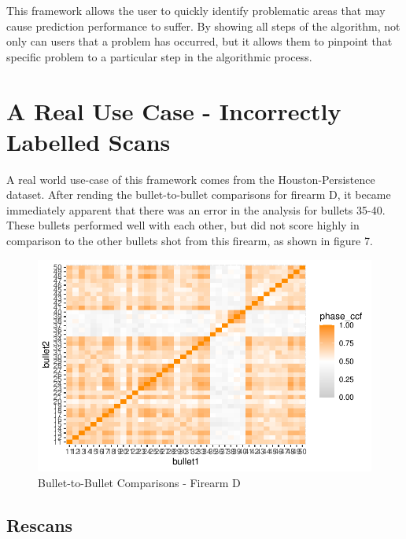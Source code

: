 \documentclass[
  number]{elsarticle}
\begin{document}
This framework allows the user to quickly identify problematic areas
that may cause prediction performance to suffer. By showing all steps of
the algorithm, not only can users that a problem has occurred, but it
allows them to pinpoint that specific problem to a particular step in
the algorithmic process.

\hypertarget{a-real-use-case---incorrectly-labelled-scans}{%
\section{A Real Use Case - Incorrectly Labelled
Scans}\label{a-real-use-case---incorrectly-labelled-scans}}

A real world use-case of this framework comes from the
Houston-Persistence dataset. After rending the bullet-to-bullet
comparisons for firearm D, it became immediately apparent that there was
an error in the analysis for bullets 35-40. These bullets performed well
with each other, but did not score highly in comparison to the other
bullets shot from this firearm, as shown in figure 7.

\begin{figure}[H]

{\centering \includegraphics{Interactive-Visualization-Framework_files/figure-pdf/unnamed-chunk-3-1.pdf}

}

\caption{Bullet-to-Bullet Comparisons - Firearm D}

\end{figure}

\hypertarget{rescans}{%
\subsection{Rescans}\label{rescans}}
\end{document}

